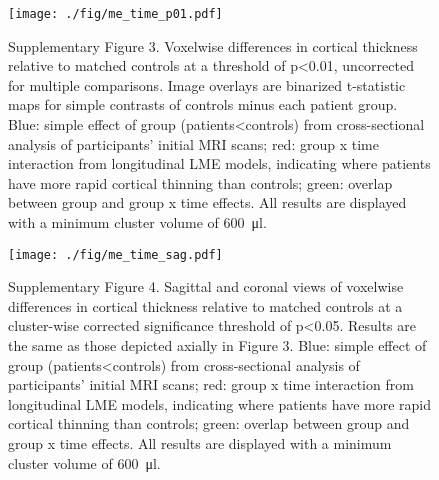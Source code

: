 \documentclass[]{article}
\begin{document}
\begin{figure}[]

{\centering \texttt{[image: ./fig/me\_time\_p01.pdf]} 

}

\caption[GM time effects]{Supplementary Figure 3. Voxelwise differences in cortical thickness relative to matched controls at a threshold of p<0.01, uncorrected for multiple comparisons. Image overlays are binarized t-statistic maps for simple contrasts of controls minus each patient group. Blue: simple effect of group (patients<controls) from cross-sectional analysis of participants' initial MRI scans; red: group x time interaction from longitudinal LME models, indicating where patients have more rapid cortical thinning than controls; green: overlap between group and group x time effects. All results are displayed with a minimum cluster volume of \SI{600}{\micro\litre}. \label{gm_me_time}}

\end{figure}

\begin{figure}[]

{\centering \texttt{[image: ./fig/me\_time\_sag.pdf]} 

}

\caption[GM time effects]{Supplementary Figure 4. Sagittal and coronal views of voxelwise differences in cortical thickness relative to matched controls at a cluster-wise corrected significance threshold of p<0.05. Results are the same as those depicted axially in Figure 3. Blue: simple effect of group (patients<controls) from cross-sectional analysis of participants' initial MRI scans; red: group x time interaction from longitudinal LME models, indicating where patients have more rapid cortical thinning than controls; green: overlap between group and group x time effects. All results are displayed with a minimum cluster volume of \SI{600}{\micro\litre}. \label{gm_me_time_altviews}}

\end{figure}

\end{document}
